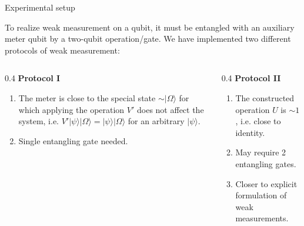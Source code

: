 \documentclass{beamer}
\begin{document}
	\begin{frame}{Experimental setup}
		
		To realize weak measurement on a qubit, it must
		be entangled with an auxiliary meter qubit by a two-qubit operation/gate. We have
		implemented two different protocols of weak measurement:
		\vspace{0.2cm}
		\begin{columns}
			\hspace{0.2cm}
			\begin{column}{0.4\textwidth}
				\textbf{Protocol I}
				\begin{enumerate}
					
					\item The meter is close to the special state $\sim|\Omega\rangle$ for which
					applying the operation $V'$ does not affect the system, i.e.
					$V'|\psi\rangle|\Omega\rangle=|\psi\rangle|\Omega\rangle$ for an arbitrary
					$|\psi\rangle$.
					
					\item Single entangling gate needed.
					
				\end{enumerate}
				
			\end{column}
			
		
			\begin{column}{0.4\textwidth}
				\textbf{Protocol II}		
				\begin{enumerate}
					
					\item The constructed operation $U$ is $\sim 1$, i.e. close to identity.
					
					\item May require 2 entangling gates.
					
					\item Closer to explicit formulation of weak measurements.
					
				\end{enumerate}
				
				
			\end{column}
		\end{columns}
		
		
	\end{frame}
	
\end{document}
